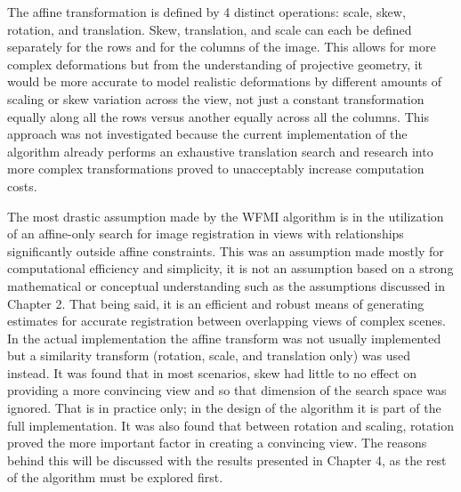 %
%
%
%
%
%
%
%
%

%
%
%



The affine transformation is defined by 4 distinct operations: scale, skew, rotation, and translation. Skew, translation, and scale can each be defined separately for the rows and for the columns of the image. This allows for more complex deformations but from the understanding of projective geometry, it would be more accurate to model realistic deformations by different amounts of scaling or skew variation across the view, not just a constant transformation equally along all the rows versus another equally across all the columns. This approach was not investigated because the current implementation of the algorithm already performs an exhaustive translation search and research into more complex transformations proved to unacceptably increase computation costs.

The most drastic assumption made by the WFMI algorithm is in the utilization of an affine-only search for image registration in views with relationships significantly outside affine constraints. This was an assumption made mostly for computational efficiency and simplicity, it is not an assumption based on a strong mathematical or conceptual understanding such as the assumptions discussed in Chapter 2. That being said, it is an efficient and robust means of generating estimates for accurate registration between overlapping views of complex scenes. In the actual implementation the affine transform was not usually implemented but a similarity transform (rotation, scale, and translation only) was used instead. It was found that in most scenarios, skew had little to no effect on providing a more convincing view and so that dimension of the search space was ignored. That is in practice only; in the design of the algorithm it is part of the full implementation. It was also found that between rotation and scaling, rotation proved the more important factor in creating a convincing view. The reasons behind this will be discussed with the results presented in Chapter 4, as the rest of the algorithm must be explored first.

